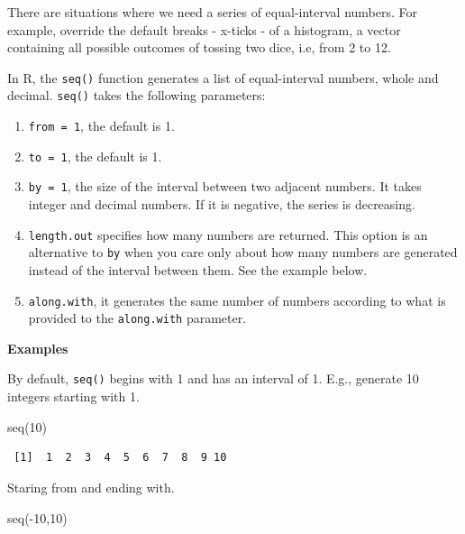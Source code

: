 \documentclass[
  letterpaper,
]{book}
\newenvironment{Shaded}{\begin{snugshade}}{\end{snugshade}}
\newcommand{\DecValTok}[1]{\textcolor[rgb]{0.68,0.00,0.00}{#1}}
\newcommand{\FunctionTok}[1]{\textcolor[rgb]{0.28,0.35,0.67}{#1}}
\newcommand{\NormalTok}[1]{\textcolor[rgb]{0.00,0.23,0.31}{#1}}
\newcommand{\SpecialCharTok}[1]{\textcolor[rgb]{0.37,0.37,0.37}{#1}}
\begin{document}
There are situations where we need a series of equal-interval numbers.
For example, override the default breaks - x-ticks - of a histogram, a
vector containing all possible outcomes of tossing two dice, i.e, from 2
to 12.

In R, the \texttt{seq()} function generates a list of equal-interval
numbers, whole and decimal. \texttt{seq()} takes the following
parameters:

\begin{enumerate}
\def\labelenumi{\arabic{enumi}.}
\item
  \texttt{from\ =\ 1}, the default is 1.
\item
  \texttt{to\ =\ 1}, the default is 1.
\item
  \texttt{by\ =\ 1}, the size of the interval between two adjacent
  numbers. It takes integer and decimal numbers. If it is negative, the
  series is decreasing.
\item
  \texttt{length.out} specifies how many numbers are returned. This
  option is an alternative to \texttt{by} when you care only about how
  many numbers are generated instead of the interval between them. See
  the example below.
\item
  \texttt{along.with}, it generates the same number of numbers according
  to what is provided to the \texttt{along.with} parameter.
\end{enumerate}

\textbf{Examples}

By default, \texttt{seq()} begins with 1 and has an interval of 1. E.g.,
generate 10 integers starting with 1.

\begin{Shaded}
\begin{Highlighting}[]
\FunctionTok{seq}\NormalTok{(}\DecValTok{10}\NormalTok{)}
\end{Highlighting}
\end{Shaded}

\begin{verbatim}
 [1]  1  2  3  4  5  6  7  8  9 10
\end{verbatim}

Staring from and ending with.

\begin{Shaded}
\begin{Highlighting}[]
\FunctionTok{seq}\NormalTok{(}\SpecialCharTok{{-}}\DecValTok{10}\NormalTok{,}\DecValTok{10}\NormalTok{)}
\end{Highlighting}
\end{Shaded}
\end{document}
